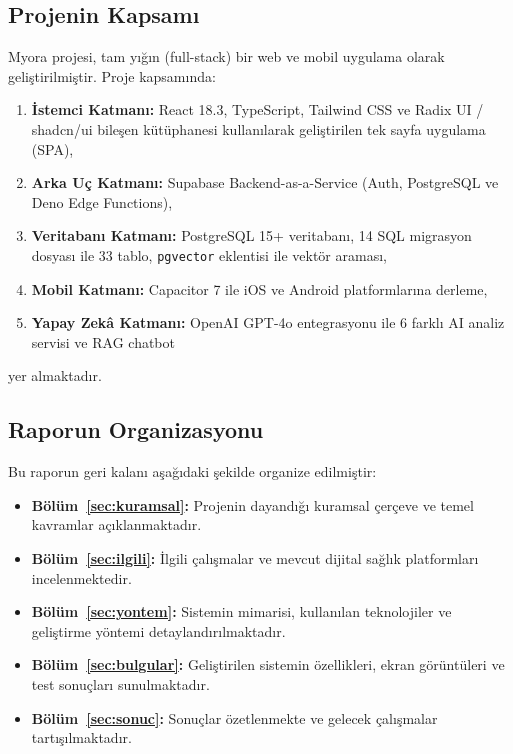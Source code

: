 \subsection{Projenin Kapsamı}

Myora projesi, tam yığın (full-stack) bir web ve mobil uygulama olarak geliştirilmiştir. Proje kapsamında:

\begin{enumerate}
    \item \textbf{İstemci Katmanı:} React 18.3, TypeScript, Tailwind CSS ve Radix UI / shadcn/ui bileşen kütüphanesi kullanılarak geliştirilen tek sayfa uygulama (SPA),
    \item \textbf{Arka Uç Katmanı:} Supabase Backend-as-a-Service (Auth, PostgreSQL ve Deno Edge Functions),
    \item \textbf{Veritabanı Katmanı:} PostgreSQL 15+ veritabanı, 14 SQL migrasyon dosyası ile 33 tablo, \texttt{pgvector} eklentisi ile vektör araması,
    \item \textbf{Mobil Katmanı:} Capacitor 7 ile iOS ve Android platformlarına derleme,
    \item \textbf{Yapay Zekâ Katmanı:} OpenAI GPT-4o entegrasyonu ile 6 farklı AI analiz servisi ve RAG chatbot
\end{enumerate}
yer almaktadır.

\subsection{Raporun Organizasyonu}

Bu raporun geri kalanı aşağıdaki şekilde organize edilmiştir:

\begin{itemize}
    \item \textbf{Bölüm~\ref{sec:kuramsal}:} Projenin dayandığı kuramsal çerçeve ve temel kavramlar açıklanmaktadır.
    \item \textbf{Bölüm~\ref{sec:ilgili}:} İlgili çalışmalar ve mevcut dijital sağlık platformları incelenmektedir.
    \item \textbf{Bölüm~\ref{sec:yontem}:} Sistemin mimarisi, kullanılan teknolojiler ve geliştirme yöntemi detaylandırılmaktadır.
    \item \textbf{Bölüm~\ref{sec:bulgular}:} Geliştirilen sistemin özellikleri, ekran görüntüleri ve test sonuçları sunulmaktadır.
    \item \textbf{Bölüm~\ref{sec:sonuc}:} Sonuçlar özetlenmekte ve gelecek çalışmalar tartışılmaktadır.
\end{itemize}
